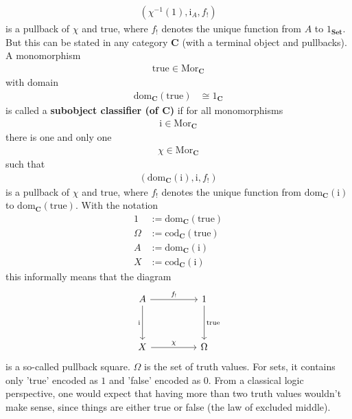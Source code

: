 \begin{exa}
\begin{enumerate}
\begin{align*}
  \left(
    \chi^{-1}(1),
    \mathrm{i}_{A},
    f_{!}
  \right)
\end{align*}
is a pullback of $\chi$ and $\mathrm{true}$, where $f_{!}$ denotes the unique function from $A$ to $1_{\mathbf{Set}}$.
But this can be stated in any category $\mathbf{C}$ (with a terminal object and pullbacks).
A monomorphism
\begin{align*}
  \mathrm{true}
  \in
  \mathrm{Mor}_{\mathbf{C}}
\end{align*}
with domain
\begin{align*}
  \mathrm{dom}_{\mathbf{C}}(\mathrm{true})
  &\cong
  1_{\mathbf{C}}
\end{align*}
is called a \textbf{subobject classifier (of $\mathbf{C}$)} if for all monomorphisms
\begin{align*}
  \mathrm{i}
  \in
  \mathrm{Mor}_{\mathbf{C}}
\end{align*}
there is one and only one
\begin{align*}
  \chi
  \in
  \mathrm{Mor}_{\mathbf{C}}
\end{align*}
such that
\begin{align*}
  \left(
    \mathrm{dom}_{\mathbf{C}}(\mathrm{i}),
    \mathrm{i},
    f_{!}
  \right)
\end{align*}
is a pullback of $\chi$ and $\mathrm{true}$, where $f_{!}$ denotes the unique function from $\mathrm{dom}_{\mathbf{C}}(\mathrm{i})$ to $\mathrm{dom}_{\mathbf{C}}(\mathrm{true})$.
With the notation
\begin{align*}
  1
  &:=
  \mathrm{dom}_{\mathbf{C}}(\mathrm{true})
  \\
  \Omega
  &:=
  \mathrm{cod}_{\mathbf{C}}(\mathrm{true})
  \\
  A
  &:=
  \mathrm{dom}_{\mathbf{C}}(\mathrm{i})
  \\
  X
  &:=
  \mathrm{cod}_{\mathbf{C}}(\mathrm{i})
\end{align*}
this informally means that the diagram
\[
\begin{tikzcd}[sep=huge]
  A
  \arrow{r}{f_{!}}
  \arrow[swap]{d}{\mathrm{i}}
  &
  1
  \arrow{d}{\mathrm{true}}
  \\
  X
  \arrow{r}{\chi}
  &
  \Omega
\end{tikzcd}
\]
is a so-called pullback square.
$\Omega$ is the set of truth values.
For sets, it contains only 'true' encoded as $1$ and 'false' encoded as $0$.
From a classical logic perspective, one would expect that having more than two truth values wouldn't make sense, since things are either true or false (the law of excluded middle).

\end{enumerate}
\end{exa}
